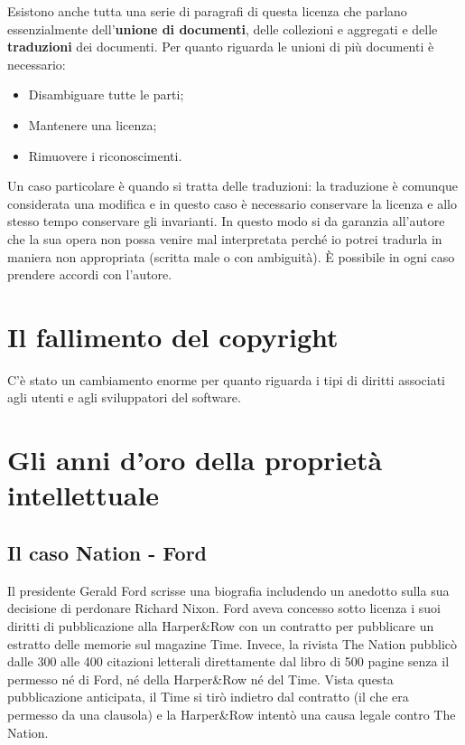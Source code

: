Esistono anche tutta una serie di paragrafi di questa licenza che parlano essenzialmente dell'\textbf{unione di documenti}, delle collezioni e aggregati e delle \textbf{traduzioni} dei documenti. Per quanto riguarda le unioni di più documenti è necessario:

\begin{itemize}

\item Disambiguare tutte le parti;
\item Mantenere una licenza;
\item Rimuovere i riconoscimenti.

\end{itemize}

Un caso particolare è quando si tratta delle traduzioni: la traduzione è comunque considerata una modifica e in questo caso è necessario conservare la licenza e allo stesso tempo conservare gli invarianti. In questo modo si da garanzia all'autore che la sua opera non possa venire mal interpretata perché io potrei tradurla in maniera non appropriata (scritta male o con ambiguità). È possibile in ogni caso prendere accordi con l'autore.

\section{Il fallimento del copyright}

C'è stato un cambiamento enorme per quanto riguarda i tipi di diritti associati agli utenti e agli sviluppatori del software. 

\section{Gli anni d'oro della proprietà intellettuale}
\subsection{Il caso Nation - Ford}

Il presidente Gerald Ford scrisse una biografia includendo un anedotto sulla sua decisione di perdonare Richard Nixon. 
Ford aveva concesso sotto licenza i suoi diritti di pubblicazione alla Harper\&Row con un contratto per pubblicare un estratto delle memorie sul magazine Time. 
Invece, la rivista The Nation pubblicò dalle 300 alle 400 citazioni letterali direttamente dal libro di 500 pagine senza il permesso né di Ford, né della Harper\&Row né del Time.
Vista questa pubblicazione anticipata, il Time si tirò indietro dal contratto (il che era permesso da una clausola) e la Harper\&Row intentò una causa legale contro The Nation.\\

